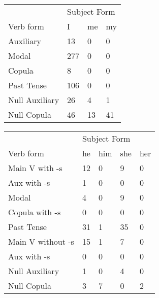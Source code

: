 \begin{table}[]
\begin{minipage}{0.5\textwidth}
    \centering
    \begin{tabular}{@{}llll@{}}
        \toprule
            &\multicolumn{3}{l}{Subject Form}\\
            \cline{2-4}
        Verb form & I & me & my \\
        \midrule
        Auxiliary & 13 & 0 & 0 \\
        Modal & 277 & 0 & 0 \\
        Copula & 8 & 0 & 0 \\
        Past Tense & 106 & 0 & 0 \\
        \hline
        Null Auxiliary & 26 & 4 & 1 \\
        Null Copula & 46 & 13 & 41 \\
        \bottomrule
    \end{tabular}
\end{minipage}
\begin{minipage}{0.5\textwidth}
    \centering
    \begin{tabular}{@{}lllll@{}}
        \toprule
            &\multicolumn{4}{l}{Subject Form}\\
            \cline{2-5}
        Verb form & he & him & she & her \\
        \midrule
        Main V with -s & 12 & 0 & 9 & 0 \\
        Aux with -s & 1 & 0 & 0 & 0 \\
        Modal & 4 & 0 & 9 & 0 \\
        Copula with -s & 0 & 0 & 0 & 0 \\
        Past Tense & 31 & 1 & 35 & 0 \\
        \hline
        Main V without -s & 15 & 1 & 7 & 0 \\
        Aux with -s & 0 & 0 & 0 & 0 \\
        Null Auxiliary & 1 & 0 & 4 & 0 \\
        Null Copula & 3 & 7 & 0 & 2 \\
        \bottomrule
    \end{tabular}
    \end{minipage}
\end{table}
